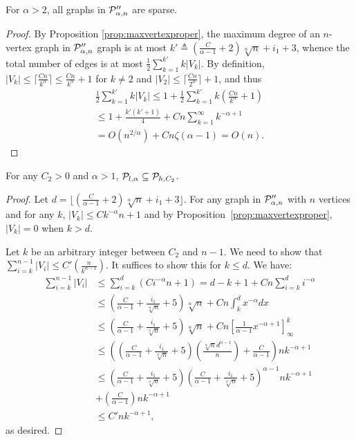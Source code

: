 \begin{proposition}\label{prop:powerlawsparse}
For $\alpha > 2$, all graphs in $ \mathcal{P}''_{\alpha,n}$ are sparse.
\end{proposition}
\begin{proof}
By Proposition \ref{prop:maxvertexproper}, the maximum degree of an $n$-vertex graph in $ \mathcal{P}''_{\alpha,n}$
graph is at most $k' \triangleq \left(\frac{C}{\alpha - 1} + 2\right) \sqrt[\alpha]{n} + i_1 + 3$, whence
the total number of edges is at most $\frac{1}{2}\sum_{k=1}^{k'} k \vert V_k\vert$. By definition,
$\vert V_k \vert\leq \lceil \frac{Cn}{k^\alpha}\rceil \leq \frac{Cn}{k^{\alpha}} + 1$ for $k\neq 2$ and $\vert V_2\vert\leq\lceil\frac{Cn}{2^{\alpha}}\rceil + 1$, and thus
\begin{align*}
\frac{1}{2}\sum_{k=1}^{k'} k\vert V_k\vert \leq 1 + \frac{1}{2}\sum_{k=1}^{k'} k \left(\frac{Cn}{k^{\alpha}} + 1 \right) \\
\leq 1 + \frac{k'(k'+1)}{4} + Cn\sum_{k=1}^{\infty} k^{-\alpha+1} \\
= O(n^{2/\alpha}) + Cn \zeta(\alpha - 1) = O(n).
\end{align*}
\end{proof}

\begin{proposition}\label{prop:Contained}
For any $C_2 > 0$ and $\alpha > 1$,
$ \mathcal{P}_{l,\alpha} \subseteq  \mathcal{P}_{h,C_2}$.
\end{proposition}
\begin{proof}
Let $d = \lfloor(\frac C{\alpha - 1} + 2)\sqrt[\alpha]{n} + i_1 + 3\rfloor$. For any graph in $ \mathcal{P}''_{\alpha,n}$ with $n$ vertices and for any $k$, $\vert V_k\vert\leq Ck^{-\alpha}n + 1$ and by Proposition~\ref{prop:maxvertexproper}, $\vert V_k\vert = 0$ when $k > d$.

Let $k$ be an arbitrary integer between $C_2$ and $n-1$. We need to show that $\sum_{i = k}^{n-1} {\vert V_i\vert} \leq C'(\frac{n}{k^{\alpha-1}})$. It suffices to show this for $k\leq d$. We have:
\begin{align*}
  \sum_{i = k}^{n-1} {\vert V_i\vert} & \leq \sum_{i = k}^d(Ci^{-\alpha}n + 1)=    d - k + 1 + Cn\sum_{i = k}^d i^{-\alpha}\\
  & \leq \left(\frac C{\alpha - 1} + \frac{i_1}{\sqrt[\alpha]n} + 5\right)\sqrt[\alpha]{n} + Cn\int_k^d x^{-\alpha}dx\\
  & \leq \left(\frac C{\alpha - 1} + \frac{i_1}{\sqrt[\alpha]n} + 5\right)\sqrt[\alpha]{n} + Cn\left[\frac 1{\alpha - 1}x^{-\alpha+1}\right]_\infty^k\\
  & \leq \left(\left(\frac C{\alpha - 1} + \frac{i_1}{\sqrt[\alpha]n} + 5\right)\left(\frac{\sqrt[\alpha]nd^{\alpha-1}}n\right) + \frac {C}{\alpha - 1}\right)nk^{-\alpha +1}\\
  & \leq \left(\frac C{\alpha - 1} + \frac{i_1}{\sqrt[\alpha]n} + 5\right)\left(\frac C{\alpha-1} + \frac{i_1}{\sqrt[\alpha]n} + 5\right)^{\alpha - 1}  nk^{-\alpha+1} \\
  & +  \left(\frac{C}{\alpha - 1}\right) nk^{-\alpha+1} \\
  & \leq C'nk^{-\alpha+1},
\end{align*}
as desired.
\end{proof}

